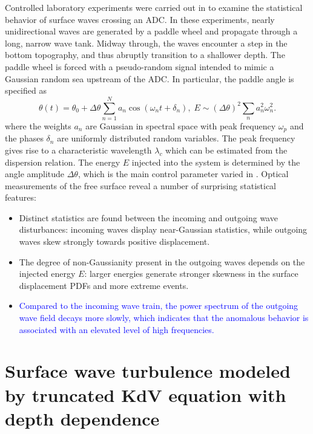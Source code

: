 \documentclass[9pt,twocolumn,twoside,lineno]{pnas-new}
\begin{document}
Controlled laboratory experiments were carried out in  \cite{bolles2018anomalous} to examine the statistical behavior of surface waves crossing an ADC. In these experiments, nearly unidirectional waves are generated by a paddle wheel and propagate through a long, narrow wave tank. Midway through, the waves encounter a step in the bottom topography, and thus abruptly transition to a shallower depth. The paddle wheel is forced with a pseudo-random signal intended to mimic a Gaussian random sea upstream of the ADC. In particular, the paddle angle is specified as
\[
\theta\left(t\right)=\theta_{0}+\Delta\theta\sum_{n=1}^{N}a_{n}\cos\left(\omega_{n}t+\delta_{n}\right),\;E\sim\left(\Delta\theta\right)^{2}\sum_{n}a_{n}^{2}\omega_{n}^{2}.
\]
where the weights $a_n$ are Gaussian in spectral space with peak frequency $\omega_p$ and the phases $\delta_n$ are uniformly distributed random variables. The peak frequency gives rise to a characteristic wavelength $\lambda_c$ which can be estimated from the dispersion relation. The energy $E$ injected into the system is determined by the angle amplitude $\Delta\theta$, which is the main control parameter varied in \cite{bolles2018anomalous}. Optical measurements of the free surface reveal a number of surprising statistical features:
\begin{itemize}
\item Distinct statistics are found between the incoming and outgoing wave
disturbances: incoming waves display near-Gaussian statistics,
while outgoing waves skew strongly towards positive displacement.
\item The degree of non-Gaussianity present in the outgoing waves depends on the injected energy $E$: 
larger energies generate stronger skewness in the surface displacement PDFs and more extreme events.
\item \textcolor{blue} {Compared to the incoming wave train, the power spectrum of the outgoing wave field decays more slowly, which indicates that the anomalous behavior is associated with an elevated level of high frequencies.}
\end{itemize}

\section{Surface wave turbulence modeled by truncated KdV equation with depth dependence\label{sec:Surface-wave-turbulence}}
\end{document}
